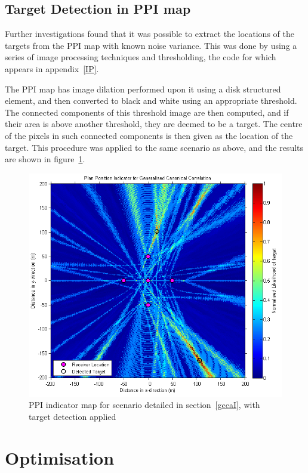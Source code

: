 \documentclass[12pt,openany,a4paper]{book}
\begin{document}
\subsection{Target Detection in PPI map}
Further investigations found that it was possible to extract the locations of the targets from the PPI map with known noise variance. This was done by using a series of image processing techniques and thresholding, the code for which appears in appendix~\ref{IP}.

\bigskip

The PPI map has image dilation performed upon it using a disk structured element, and then converted to black and white using an appropriate threshold. The connected components of this threshold image are then computed, and if their area is above another threshold, they are deemed to be a target. The centre of the pixels in such connected components is then given as the location of the target. This procedure was applied to the same scenario as above, and the results are shown in figure~\ref{ppiip}.

\begin{figure}[htbp]
\centerline{\includegraphics{ppiip.png}}
\caption{PPI indicator map for scenario detailed in section~\ref{gccaI}, with target detection applied}
\label{ppiip}
\end{figure}

\section{Optimisation}
\end{document}
